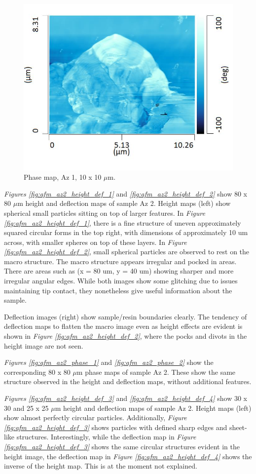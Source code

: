 \begin{figure}[H]
\centering
  \includegraphics[width=.45\textwidth]{Az1_tapping_mode_240521_phase_3}
\caption[Phase map, Az 1]{Phase map, Az 1, 10 x 10 $\mu$m.}
\label{fig:afm_az1_phase_8}
\end{figure}



\textit{Figures \ref{fig:afm_az2_height_def_1}} and \textit{\ref{fig:afm_az2_height_def_2}} show 80 x 80 $\mu$m height and deflection maps of sample Az 2. Height maps (left) show spherical small particles sitting on top of larger features. In \textit{Figure \ref{fig:afm_az2_height_def_1}}, there is a fine structure of uneven approximately squared circular forms in the top right, with dimensions of approximately 10 um across, with smaller spheres on top of these layers. In \textit{Figure \ref{fig:afm_az2_height_def_2}}, small spherical particles are observed to rest on the macro structure. The macro structure appears irregular and pocked in areas. There are areas such as (x = 80 um, y = 40 um) showing sharper and more irregular angular edges. While both images show some glitching due to issues maintaining tip contact, they nonetheless give useful information about the sample.

Deflection images (right) show sample/resin boundaries clearly. The tendency of deflection maps to flatten the macro image even as height effects are evident is shown in \textit{Figure \ref{fig:afm_az2_height_def_2}}, where the pocks and divots in the height image are not seen.

\textit{Figures \ref{fig:afm_az2_phase_1}} and \textit{\ref{fig:afm_az2_phase_2}} show the corresponding 80 x 80 $\mu$m phase maps of sample Az 2. These show the same structure observed in the height and deflection maps, without additional features. 

\textit{Figures \ref{fig:afm_az2_height_def_3}} and \textit{\ref{fig:afm_az2_height_def_4}} show 30 x 30 and 25 x 25 $\mu$m height and deflection maps of sample Az 2. Height maps (left) show almost perfectly circular particles. Additionally, \textit{Figure \ref{fig:afm_az2_height_def_3}} shows particles with defined sharp edges and sheet-like structures. Interestingly, while the deflection map in \textit{Figure \ref{fig:afm_az2_height_def_3}} shows the same circular structures evident in the height image, the deflection map in \textit{Figure \ref{fig:afm_az2_height_def_4}} shows the inverse of the height map. This is at the moment not explained. 

